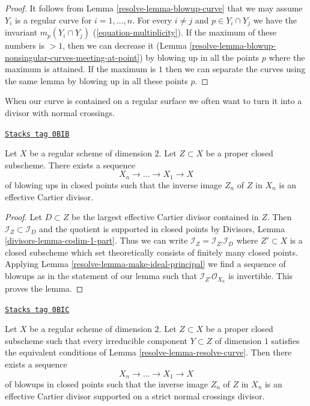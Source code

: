 \begin{proof}

It follows from Lemma \ref{resolve-lemma-blowup-curve} that we may assume $Y_i$
is a regular curve for $i = 1, \ldots, n$. For every $i \not = j$
and $p \in Y_i \cap Y_j$ we have the invariant
$m_p(Y_i \cap Y_j)$ (\ref{equation-multiplicity}).
If the maximum of these numbers is $> 1$, then we can decrease
it (Lemma \ref{resolve-lemma-blowup-nonsingular-curves-meeting-at-point})
by blowing up in all the points $p$ where the maximum is attained.
If the maximum is $1$ then we can separate the curves using the
same lemma by blowing up in all these points $p$.
\end{proof}

When our curve is contained on a regular surface we often want to
turn it into a divisor with normal crossings.

\begin{lemma}
\label{resolve-lemma-turn-into-effective-Cartier}
\href{https://stacks.math.columbia.edu/tag/0BIB}{\texttt{Stacks tag 0BIB}}

Let $X$ be a regular scheme of dimension $2$. Let $Z \subset X$
be a proper closed subscheme. There exists a sequence
$$
X_n \to \ldots \to X_1 \to X
$$
of blowing ups in closed points such that the inverse image $Z_n$ of $Z$
in $X_n$ is an effective Cartier divisor.
\end{lemma}

\begin{proof}

Let $D \subset Z$ be the largest effective Cartier divisor contained in $Z$.
Then $\mathcal{I}_Z \subset \mathcal{I}_D$ and the quotient is supported
in closed points by Divisors, Lemma \ref{divisors-lemma-codim-1-part}.
Thus we can write $\mathcal{I}_Z = \mathcal{I}_{Z'} \mathcal{I}_D$
where $Z' \subset X$ is a closed subscheme which set theoretically
consists of finitely many closed points. Applying
Lemma \ref{resolve-lemma-make-ideal-principal}
we find a sequence of blowups as in the statement of our lemma
such that $\mathcal{I}_{Z'}\mathcal{O}_{X_n}$ is invertible.
This proves the lemma.
\end{proof}

\begin{lemma}
\label{resolve-lemma-embedded-resolution}
\href{https://stacks.math.columbia.edu/tag/0BIC}{\texttt{Stacks tag 0BIC}}

Let $X$ be a regular scheme of dimension $2$. Let $Z \subset X$
be a proper closed subscheme such that every irreducible component
$Y \subset Z$ of dimension $1$ satisfies the equivalent conditions of
Lemma \ref{resolve-lemma-resolve-curve}. Then there exists a sequence
$$
X_n \to \ldots \to X_1 \to X
$$
of blowups in closed points such that the inverse image $Z_n$ of $Z$
in $X_n$ is an effective Cartier divisor supported on a strict normal crossings
divisor.
\end{lemma}

